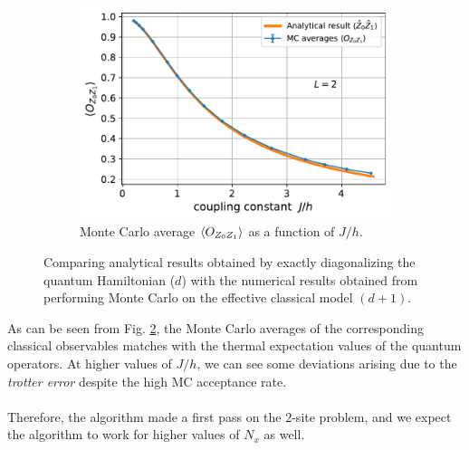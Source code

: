 \documentclass[../journal_main.tex]{subfiles}
\begin{document}
\begin{figure}[!htb]\ContinuedFloat
    \centering
    \begin{subfigure}[b]{0.6\textwidth}  %
        \centering
        \includegraphics[width=\textwidth]{images/2_site/O_Z0Z1.pdf}
        \caption{Monte Carlo average $\expval{O_{Z_0 Z_1}}$ as a function of $J/h$.}
        \label{expval_O_ZZ_vs_J/h_2}
    \end{subfigure}
    \caption{Comparing analytical results obtained by exactly diagonalizing the quantum Hamiltonian ($d$)  with the numerical results obtained from performing Monte Carlo on the effective classical model $(d+1)$.}
    \label{expval_O_vs_J/h_2}
\end{figure}
\FloatBarrier
As can be seen from Fig. \ref{expval_O_vs_J/h_2}, the Monte Carlo averages of the corresponding classical observables matches with the thermal expectation values of the quantum operators. At higher values of $J/h$, we can see some deviations arising due to the \textit{trotter error} despite the high MC acceptance rate.~\\~\\
Therefore, the algorithm made a first pass on the $2$-site problem, and we expect the algorithm to work for higher values of $N_x$ as well.   
\end{document}

